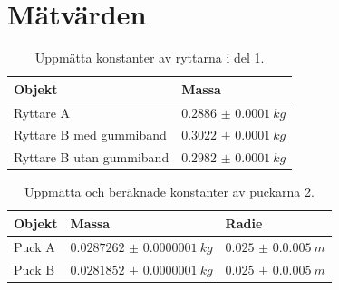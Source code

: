 

\newpage


\newpage



\section{Mätvärden} \label{bil:mätning}

\begin{table}[H]
\centering
\caption{Uppmätta konstanter av ryttarna i del 1.}
\label{tab:prop1}
\begin{tabular}{@{}ll@{}}
\toprule
Objekt    & Massa                                 \\ \midrule
Ryttare A  & $\SI{0.2886(1)}{kg}$                 \\
Ryttare B med gummiband& $\qty{0.3022(1)}{kg}$  \\
Ryttare B utan gummiband& $\qty{0.2982(1)}{kg}$ \\ \bottomrule
\end{tabular}
\end{table}

\begin{table}[H]
\centering
\caption{Uppmätta och beräknade konstanter av puckarna 2.}
\label{tab:prop2}
\begin{tabular}{@{}lll@{}}
\toprule
Objekt    & Massa                   & Radie             \\ \midrule
Puck A    & $\qty{0.0287262(1)}{kg}$   & $\qty{0.025(0.0005)}{m}$          \\
Puck B    & $\qty{0.0281852(1)}{kg}$   & $\qty{0.025(0.0005)}{m}$          \\ \bottomrule
\end{tabular}
\end{table}

